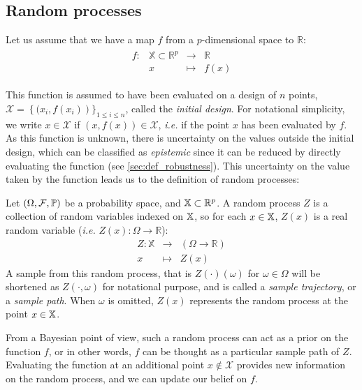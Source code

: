 \documentclass[../../Main_ManuscritThese.tex]{subfiles}
\begin{document}
\subsection{Random processes}
Let us assume that we have a map $f$ from a $p$-dimensional space to $\mathbb{R}$:
\begin{align}
  \begin{array}{rrcl}
    f: & \mathbb{X} \subset \mathbb{R}^p& \longrightarrow & \mathbb{R} \\
       & x & \longmapsto & f(x)
  \end{array}
\end{align}

This function is assumed to have been evaluated on a design of $n$
points,
$\mathcal{X} = \left\{ (x_i, f(x_i) \right)\}_{1\leq i\leq n}$, called
the \emph{initial design}. For notational simplicity, we write
$x\in \mathcal{X}$ if $(x, f(x)) \in \mathcal{X}$, \textit{i.e.} if
the point $x$ has been evaluated by $f$.  As this function is unknown,
there is uncertainty on the values outside the initial design, which
can be classified as \emph{epistemic} since it can be reduced by
directly evaluating the function (see \cref{sec:def_robustness}).
This uncertainty on the value taken by the function leads us to the
definition of random processes:
\begin{definition}
  Let $(\Omega, \mathcal{F}, \mathbb{P})$ be a probability space, and
  $\mathbb{X}\subset \mathbb{R}^p$.  A random process $Z$ is a collection
  of random variables indexed on $\mathbb{X}$, so for each
  $x \in \mathbb{X}$, $Z(x)$ is a real random variable (\textit{i.e.}
  $Z(x):\Omega \rightarrow \mathbb{R}$):
 \begin{equation}
  \begin{array}{rcl}
    Z: \mathbb{X} & \longrightarrow & \left(\Omega \rightarrow \mathbb{R} \right)\\
    x& \longmapsto & Z(x)
  \end{array}
\end{equation}
A sample from this random process, that is $Z(\cdot)(\omega)$ for
$\omega \in \Omega$ will be shortened as $Z(\cdot, \omega)$ for
notational purpose, and is called a \emph{sample trajectory}, or a
\emph{sample path}.  When $\omega$ is omitted, $Z(x)$ represents the
random process at the point $x \in \mathbb{X}$.
\end{definition}
From a Bayesian point of view, such a random process can act as a
prior on the function $f$, or in other words, $f$ can be thought as a
particular sample path of $Z$.  Evaluating the function at an
additional point $x \notin \mathcal{X}$ provides new information on
the random process, and we can update our belief on $f$.
\end{document}
